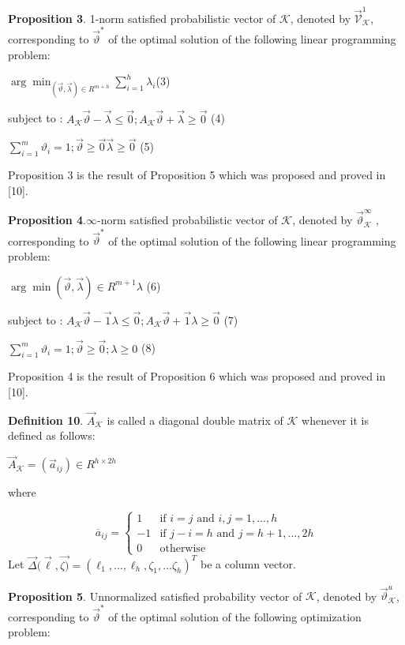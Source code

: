 \documentclass[]{iosart2c}
\begin{document}
  \textbf{Proposition 3}. 1-norm satisfied probabilistic vector of $\mathcal{K}$, denoted by $\vec{\mathcal{V}}^1_\mathcal{K}$, corresponding to $\vec{\vartheta}^*$ of the optimal solution of the following linear programming problem:

  $\arg \min _{(\vec{\vartheta},\vec{\lambda}) \in R^{m+h}} \sum^h_{i=1}\lambda_i$(3)

  subject to : $A_\mathcal{K} \vec{\vartheta} - \vec{\lambda} \le \vec{0}; A_\mathcal{K}\vec{\vartheta} + \vec{\lambda}\geq\vec{0}$ (4)

  $\sum^m_{i=1} \vartheta_i = 1; \vec{\vartheta}\geq\vec{0}    \vec{\lambda}\geq \vec{0}$ (5)

  Proposition 3 is the result of Proposition 5 which was proposed and proved in [10].

  \textbf{Proposition 4}.$\infty$-norm satisfied probabilistic vector of $\mathcal{K}$, denoted by $\vec{\vartheta}^\infty_\mathcal{K}$ , corresponding to $\vec{\vartheta}^*$ of the optimal solution of the following linear programming problem:

  $\arg \min(\vec{\vartheta},\vec{\lambda}) \in R^{m+1}\lambda$ (6)

  subject to : $A_\mathcal{K}\vec{\vartheta} -\vec{1}\lambda \le \vec{0}; A_\mathcal{K}\vec{\vartheta} +\vec{1}\lambda \geq \vec{0}$ (7)

  $\sum^m_{i=1} \vartheta_i = 1; \vec{\vartheta}\geq\vec{0}; \lambda\geq 0$ (8)

  Proposition 4 is the result of Proposition 6 which was proposed and proved in [10].

  \textbf{Definition 10}. $\vec{A}_\mathcal{K}$ is called a diagonal double matrix of $\mathcal{K}$ whenever it is defined as follows:

  $\vec{A}_\mathcal{K} = (\vec{a}_{ij}) \in R^{h \times 2h}$

  where

  $$\overline{a}_{ij} =
  \begin{cases}
    1        &\text{if $i = j$ and $i, j = 1, ... , h$}\\
    -1    &\text{if $j - i = h$ and $j = h + 1, ... , 2h$}\\
    0        &\text{otherwise}
  \end{cases}
  $$
  Let $\vec{\Delta}(\vec{\ell},\vec{\zeta)} = (\ell_1, ..., \ell_h, \zeta_1, ...\zeta_h)^T$ be a column vector.

  \textbf{Proposition 5}. Unnormalized satisfied probability vector of $\mathcal{K}$, denoted by $\vec{\vartheta}^u_\mathcal{K}$, corresponding to $\vec{\vartheta}^*$ of the optimal solution of the following optimization problem:
\end{document}
